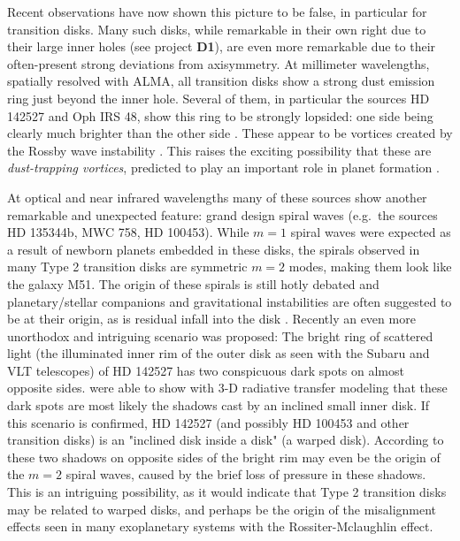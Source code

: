 \documentclass[10pt,fleqn,twoside]{article}
\begin{document}
Recent observations have now shown this picture to be false, in particular
for transition disks. Many such disks, while remarkable in their own right
due to their large inner holes (see project {\bf D1}), are even more
remarkable due to their often-present strong deviations from axisymmetry. At
millimeter wavelengths, spatially resolved with ALMA, all transition disks
show a strong dust emission ring just beyond the inner hole. Several of
them, in particular the sources HD 142527 and Oph IRS 48, show this ring to
be strongly lopsided: one side being clearly much brighter than the other
side \citep{2013Natur.493..191C,2013Sci...340.1199V}. These appear to be
vortices created by the Rossby wave instability \citep{2012MNRAS.419.1701R}.
This raises the exciting possibility that these are {\em dust-trapping
  vortices}, predicted to play an important role in planet formation
\citep{1995A&A...295L...1B,1997Icar..128..213K}.

At optical and near infrared wavelengths many of these sources show another
remarkable and unexpected feature: grand design spiral waves (e.g.~the
sources HD 135344b, MWC 758, HD 100453). While $m=1$ spiral waves were
expected as a result of newborn planets embedded in these disks, the spirals
observed in many Type 2 transition disks are symmetric $m=2$ modes, making
them look like the galaxy M51. The origin of these spirals is still hotly
debated and planetary/stellar companions \citep{2016ApJ...816L..12D} and
gravitational instabilities \citep{2016arXiv161109361T} are often suggested
to be at their origin, as is residual infall into the disk
\citep{2015A&A...582L...9L}. Recently an even more unorthodox and intriguing
scenario was proposed: The bright ring of scattered light (the illuminated
inner rim of the outer disk as seen with the Subaru and VLT telescopes) of
HD 142527 has two conspicuous dark spots on almost opposite
sides. \citet{2015ApJ...798L..44M} were able to show with 3-D radiative
transfer modeling that these dark spots are most likely the shadows cast by
an inclined small inner disk. If this scenario is confirmed, HD 142527 (and
possibly HD 100453 and other transition disks) is an "inclined disk inside a
disk" (a warped disk). According to \citet{2016ApJ...823L...8M} these two
shadows on opposite sides of the bright rim may even be the origin of the
$m=2$ spiral waves, caused by the brief loss of pressure in these shadows.
This is an intriguing possibility, as it would indicate that Type 2
transition disks may be related to warped disks, and perhaps be the origin
of the misalignment effects seen in many exoplanetary systems with the
Rossiter-Mclaughlin effect.
\end{document}
